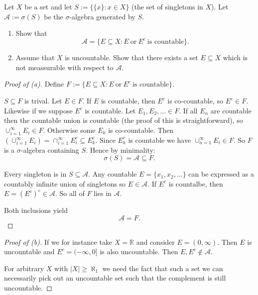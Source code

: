 \begin{prob*}[3]
    Let $X$ be a set and let $S := \{\{x\} : x \in X\}$ (the 
    set of singletons in $X$). Let $\mathcal A := \sigma(S)$ be 
    the $\sigma$-algebra generated by $S$.

    \begin{enumerate}[label=\alph*)]
        \item Show that 
            \[
                \mathcal A = \{E \subseteq X : E \ 
                \text{or} \ E^c \ \text{is countable}\}.
            \]
        \item Assume that $X$ is uncountable. Show that there exists
            a set $E \subseteq X$ which is not meassurable with 
            respect to $\mathcal A$.
    \end{enumerate}
\end{prob*}
\begin{proof}[Proof of (a)]
    Define $F := \{E \subseteq X : E \ \text{or} \ E^c \ 
    \text{is countable}\}$.
    
    $S \subseteq F$ is trival.
    Let $E \in F$. If $E$ is countable, then $E^c$ is co-countable, 
    so $E^c \in F$. Likewise if we suppose $E^c$ is countable.
    Let $E_1,E_2,\ldots \in F$. If all $E_n$ are countable then 
    the countable union is countable (the proof of this 
    is straightforward), so $\cup_{i=1}^\infty E_i \in F$. Otherwise 
    some $E_k$ is co-countable. Then 
    $(\cup_{i=1}^\infty E_i) = \cap_{i=1}^\infty E_i^c \subseteq 
    E_k^c$. Since $E_k^c$ is countable we have 
    $\cup_{n=1}^\infty E_i \in F$.
    So $F$ is a $\sigma$-algebra containing $S$. Hence by 
    minimality: 
    \[
        \sigma(S) = \mathcal A \subseteq F.
    \]

    Every singleton is in $S \subseteq \mathcal A$. Any 
    countable $E = \{x_1,x_2,\ldots\}$ can be expressed as 
    a countably infinite union of singletons so $E \in \mathcal A$.
    If $E^c$ is countalbe, then $E = (E^c)^c \in \mathcal A$.
    So all of $F$ lies in $\mathcal A$.
    
    Both inclusions yield 
    \[
        \mathcal A = F.
    \]
    
\end{proof}
\begin{proof}[Proof of (b)]
    If we for instance take 
    $X = \mathbb R$ and consider $E = (0,\infty)$. Then 
    $E$ is uncountable and $E^c = (-\infty,0]$ is also uncountable. 
    Then $E, E^c \not\in \mathcal A$.

    For arbitrary $X$ with $|X| \geq \aleph_1$ we need 
    the fact that such a set we can necessarily pick out an 
    uncountable set such that the complement is still uncountable. 
\end{proof}

